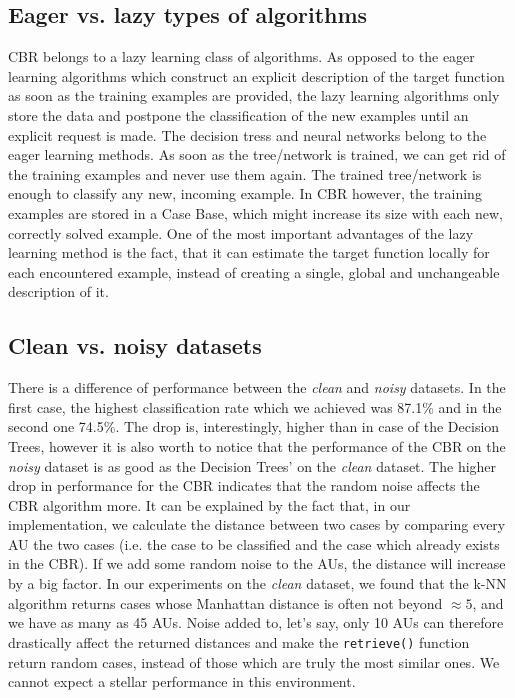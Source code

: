 \documentclass[a4paper]{article}
\begin{document}
\subsection{Eager vs. lazy types of algorithms}

CBR belongs to a lazy learning class of algorithms. As opposed to the eager learning algorithms which construct an explicit description of the target function as soon as the training examples are provided, the lazy learning algorithms only store the data and postpone the classification of the new examples until an explicit request is made. The decision tress and neural networks belong to the eager learning methods. As soon as the tree/network is trained, we can get rid of the training examples and never use them again. The trained tree/network is enough to classify any new, incoming example. In CBR however, the training examples are stored in a Case Base, which might increase its size with each new, correctly solved example. One of the most important advantages of the lazy learning method is the fact, that it can estimate the target function locally for each encountered example, instead of creating a single, global and unchangeable description of it.

\subsection{Clean vs. noisy datasets}

There is a difference of performance between the \emph{clean} and \emph{noisy} datasets. In the first case, the highest classification rate which we achieved was 87.1\% and in the second one 74.5\%. The drop is, interestingly, higher than in case of the Decision Trees, however it is also worth to notice that the performance of the CBR on the \emph{noisy} dataset is as good as the Decision Trees' on the \emph{clean} dataset. The higher drop in performance for the CBR indicates that the random noise affects the CBR algorithm more. It can be explained by the fact that, in our implementation, we calculate the distance between two cases by comparing every AU the two cases (i.e. the case to be classified and the case which already exists in the CBR). If we add some random noise to the AUs, the distance will increase by a big factor. In our experiments on the \emph{clean} dataset, we found that the k-NN algorithm returns cases whose Manhattan distance is often not beyond $\approx5$, and we have as many as 45 AUs. Noise added to, let's say, only 10 AUs can therefore drastically affect the returned distances and make the \texttt{retrieve()} function return random cases, instead of those which are truly the most similar ones. We cannot expect a stellar performance in this environment.
\end{document}

